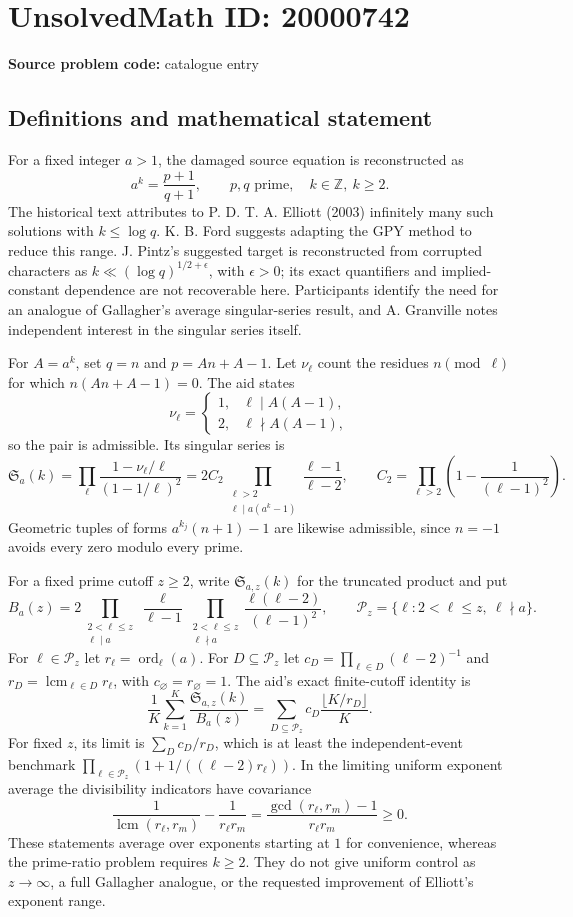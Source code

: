 \documentclass[11pt]{article}
\newcommand{\Z}{\mathbb{Z}}
\begin{document}
\section*{UnsolvedMath ID: 20000742}
\textbf{Source problem code:} catalogue entry
\subsection{Definitions and mathematical statement}
For a fixed integer $a>1$, the damaged source equation is reconstructed as
\[
a^k=\frac{p+1}{q+1},\qquad p,q\text{ prime},\quad k\in\Z,\ k\ge2.
\]
The historical text attributes to P. D. T. A. Elliott (2003) infinitely many such solutions with $k\le\log q$. K. B. Ford suggests adapting the GPY method to reduce this range. J. Pintz's suggested target is reconstructed from corrupted characters as $k\ll (\log q)^{1/2+\epsilon}$, with $\epsilon>0$; its exact quantifiers and implied-constant dependence are not recoverable here. Participants identify the need for an analogue of Gallagher's average singular-series result, and A. Granville notes independent interest in the singular series itself.

For $A=a^k$, set $q=n$ and $p=An+A-1$. Let $\nu_\ell$ count the residues $n\pmod\ell$ for which $n(An+A-1)=0$. The aid states
\[
\nu_\ell=\begin{cases}1,&\ell\mid A(A-1),\\2,&\ell\nmid A(A-1),\end{cases}
\]
so the pair is admissible. Its singular series is
\[
\mathfrak S_a(k)=\prod_\ell\frac{1-\nu_\ell/\ell}{(1-1/\ell)^2}
=2C_2\prod_{\substack{\ell>2\\\ell\mid a(a^k-1)}}\frac{\ell-1}{\ell-2},\qquad
C_2=\prod_{\ell>2}\left(1-\frac1{(\ell-1)^2}\right).
\]
Geometric tuples of forms $a^{k_j}(n+1)-1$ are likewise admissible, since $n=-1$ avoids every zero modulo every prime.

For a fixed prime cutoff $z\ge2$, write $\mathfrak S_{a,z}(k)$ for the truncated product and put
\[
B_a(z)=2\prod_{\substack{2<\ell\le z\\\ell\mid a}}\frac\ell{\ell-1}
\prod_{\substack{2<\ell\le z\\\ell\nmid a}}\frac{\ell(\ell-2)}{(\ell-1)^2},\qquad
\mathcal P_z=\{\ell:2<\ell\le z,\ \ell\nmid a\}.
\]
For $\ell\in\mathcal P_z$ let $r_\ell=\operatorname{ord}_\ell(a)$. For $D\subseteq\mathcal P_z$ let $c_D=\prod_{\ell\in D}(\ell-2)^{-1}$ and $r_D=\operatorname{lcm}_{\ell\in D}r_\ell$, with $c_\varnothing=r_\varnothing=1$. The aid's exact finite-cutoff identity is
\[
\frac1K\sum_{k=1}^K\frac{\mathfrak S_{a,z}(k)}{B_a(z)}
=\sum_{D\subseteq\mathcal P_z}c_D\frac{\lfloor K/r_D\rfloor}{K}.
\]
For fixed $z$, its limit is $\sum_Dc_D/r_D$, which is at least the independent-event benchmark $\prod_{\ell\in\mathcal P_z}(1+1/((\ell-2)r_\ell))$. In the limiting uniform exponent average the divisibility indicators have covariance
\[
\frac1{\operatorname{lcm}(r_\ell,r_m)}-\frac1{r_\ell r_m}
=\frac{\gcd(r_\ell,r_m)-1}{r_\ell r_m}\ge0.
\]
These statements average over exponents starting at $1$ for convenience, whereas the prime-ratio problem requires $k\ge2$. They do not give uniform control as $z\to\infty$, a full Gallagher analogue, or the requested improvement of Elliott's exponent range.
\end{document}
